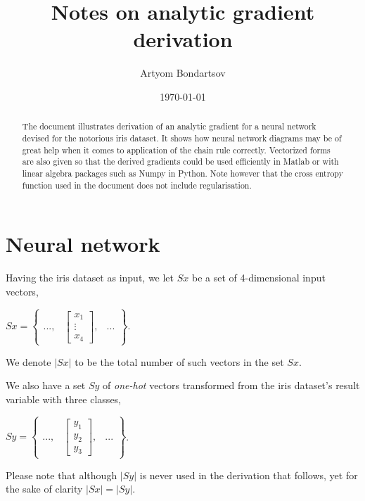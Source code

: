 \documentclass[a4paper,12pt,notitlepage]{article}
\title{Notes on analytic gradient derivation}
\author{Artyom Bondartsov}
\date{\today}
\begin{document}
\maketitle
\begin{abstract}
The document illustrates derivation of an analytic gradient for a neural network devised for the notorious iris dataset. It shows how neural network diagrams may be of great help when it comes to application of the chain rule correctly. Vectorized forms are also given so that the derived gradients could be used efficiently in Matlab or with linear algebra packages such as Numpy in Python. Note however that the cross entropy function used in the document does not include regularisation.
\end{abstract}

\section*{Neural network}
Having the iris dataset as input, we let $Sx$ be a set of 4-dimensional input vectors,
\begin{center}
$Sx=\begin{Bmatrix}
 ..., & \begin{bmatrix}
x_{1}\\ 
\vdots\\
x_{4} 
\end{bmatrix},&... 
\end{Bmatrix}$.
\end{center}
We denote $|Sx|$ to be the total number of such vectors in the set $Sx$.

We also have a set $Sy$ of \emph{one-hot} vectors transformed from the iris dataset's result variable with three classes, 
\begin{center}
 $Sy=\begin{Bmatrix}
 ..., & \begin{bmatrix}
y_{1}\\ 
y_{2}\\ 
y_{3} 

\end{bmatrix},&... 
\end{Bmatrix}$.
\end{center}
Please note that although $|Sy|$ is never used in the derivation that follows, yet for the sake of clarity $|Sx|=|Sy|$.
\end{document}
